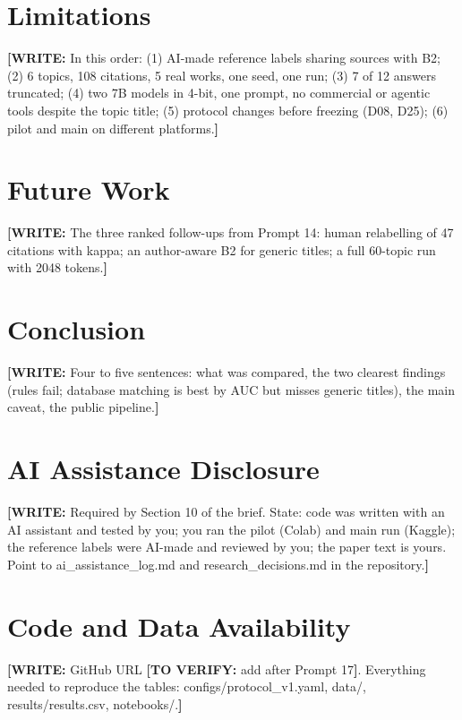 \documentclass[10pt,twocolumn]{article}
\newcommand{\writeit}[1]{\textcolor{red!70!black}{\textbf{[WRITE:} #1\textbf{]}}}
\newcommand{\tv}[1]{\textcolor{orange!80!black}{\textbf{[TO VERIFY:} #1\textbf{]}}}
\begin{document}
\section{Limitations}
\writeit{In this order: (1) AI-made reference labels sharing sources with B2; (2) 6 topics, 108 citations, 5 real works, one seed, one run; (3) 7 of 12 answers truncated; (4) two 7B models in 4-bit, one prompt, no commercial or agentic tools despite the topic title; (5) protocol changes before freezing (D08, D25); (6) pilot and main on different platforms.}

\section{Future Work}
\writeit{The three ranked follow-ups from Prompt 14: human relabelling of 47 citations with kappa; an author-aware B2 for generic titles; a full 60-topic run with 2048 tokens.}

\section{Conclusion}
\writeit{Four to five sentences: what was compared, the two clearest findings (rules fail; database matching is best by AUC but misses generic titles), the main caveat, the public pipeline.}

\section*{AI Assistance Disclosure}
\writeit{Required by Section 10 of the brief. State: code was written with an AI assistant and tested by you; you ran the pilot (Colab) and main run (Kaggle); the reference labels were AI-made and reviewed by you; the paper text is yours. Point to ai\_assistance\_log.md and research\_decisions.md in the repository.}

\section*{Code and Data Availability}
\writeit{GitHub URL \tv{add after Prompt 17}. Everything needed to reproduce the tables: configs/protocol\_v1.yaml, data/, results/results.csv, notebooks/.}



\end{document}

